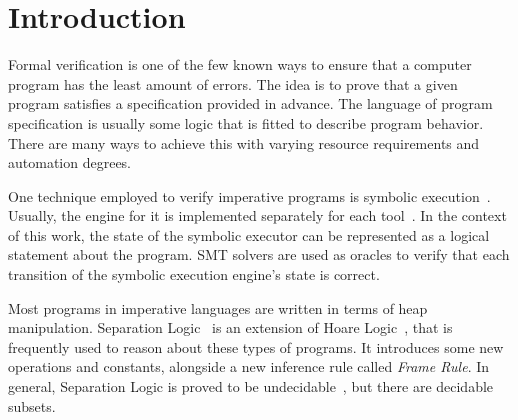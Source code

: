 \documentclass[sigplan,screen,review]{acmart}
\begin{document}



\maketitle


\newcommand{\EM}[1]{\ensuremath{#1}}
\newcommand{\ssymbol}[1]{\EM{#1}}
\newcommand{\bnfdef}{\EM{\vcentcolon\vcentcolon=}}
\newcommand{\emphbf}[1]{\textbf{\emph{#1}}}
\newcommand{\spmid}{\EM{\ \mid \ }}
\newcommand{\vsample}[1]{\EM{\mathit{sample}(#1)}}
\newcommand{\vconst}{\EM{\mathsf{c}}}
\newcommand{\anyval}{\ssymbol{v}}
\newcommand{\anydist}{\ssymbol{d}}
\newcommand{\dnormal}[2]{\EM{\mathit{Normal}(#1,#2)}}
\newcommand{\duniform}[2]{\EM{\mathit{Uniform}(#1,#2)}}

\lstset{mathescape}

\section{Introduction} 

Formal verification is one of the few known ways to ensure that a computer program has the least amount of errors. The idea is to prove that a given program satisfies a specification provided in advance. The language of program specification is usually some logic that is fitted to describe program behavior. There are many ways to achieve this with varying resource requirements and automation degrees.

One technique employed to verify imperative programs is symbolic execution~\cite{berdine2005symbolic}. Usually, the engine for it is implemented separately for each tool~\cite{DBLP:conf/fmco/BerdineCO05,DBLP:conf/oopsla/DistefanoP08}. In the context of this work, the state of the symbolic executor can be represented as a logical statement about the program. SMT solvers are used as oracles to verify that each transition of the symbolic execution engine's state is correct. 

Most programs in imperative languages are written in terms of heap manipulation. Separation Logic~\cite{DBLP:journals/cacm/OHearn19} is an extension of Hoare Logic~\cite{DBLP:journals/cacm/Hoare69}, that is frequently used to reason about these types of programs. It introduces some new operations and constants, alongside a new inference rule called \emph{Frame Rule}. In general, Separation Logic is proved to be undecidable~\cite{DBLP:conf/lics/BrotherstonK10}, but there are decidable subsets.
\end{document}

